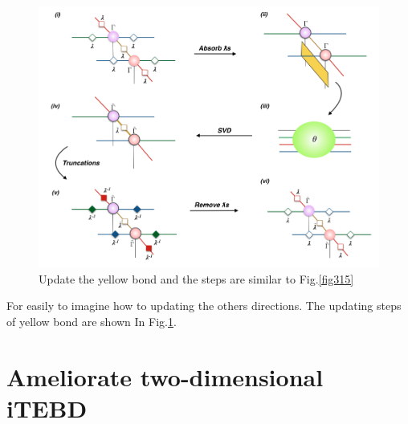 	\begin{figure}[ht]
	\centering
	\includegraphics[width=1.00\textwidth]{figures/fig316.png}
	\caption[The tensor network diagrams of updating the yellow bond in iPEPS with 2D-iTEBD]{Update the yellow bond and the steps are similar to Fig.\ref{fig315}}
	\label{fig316}
	\end{figure}

	For easily to imagine how to updating the others directions. The updating steps of yellow bond are shown In Fig.\ref{fig316}.



\section{Ameliorate two-dimensional iTEBD}
\label{2dhastin}

